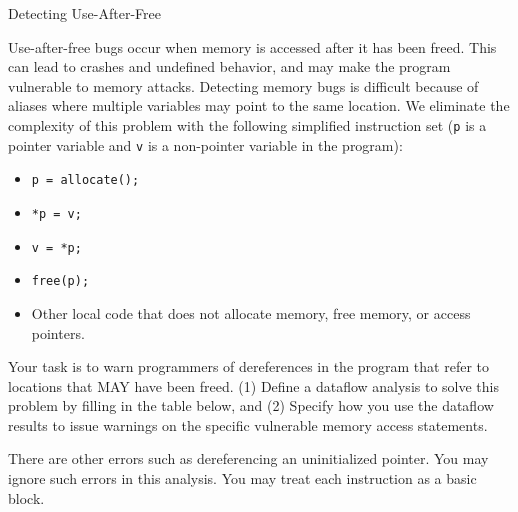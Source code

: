 \pagebreak
\begin{problem}
Detecting Use-After-Free

\item Use-after-free bugs occur when memory is accessed after it has been freed. This can lead to crashes and undefined behavior, and may make the program vulnerable to memory attacks. Detecting memory bugs is difficult because of aliases where multiple variables may point to
the same location. We eliminate the complexity of this problem with the following simplified instruction set (\texttt{p} is a pointer variable and \texttt{v} is a non-pointer variable in the program):
\begin{itemize}
	\item \texttt{p = allocate();}
	\item \texttt{*p = v;}
	\item \texttt{v = *p;}
	\item \texttt{free(p);}
	\item Other local code that does not allocate memory, free memory, or access pointers.
\end{itemize}

Your task is to warn programmers of dereferences in the program that refer to locations that MAY have been freed. (1) Define a dataflow analysis to solve this problem by filling in the table below, and (2) Specify how you use the dataflow results to issue warnings on the specific vulnerable memory access statements.

There are other errors such as dereferencing an uninitialized pointer. You may ignore such errors in this analysis. You may treat each instruction as a basic block.


\end{problem}
